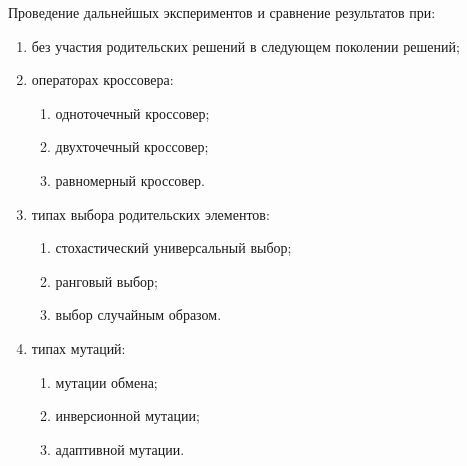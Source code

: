 Проведение дальнейшых экспериментов и сравнение результатов при:
\begin{enumerate}
  \item без участия родительских решений в следующем поколении решений;
  \item операторах кроссовера:
  \begin{enumerate}
    \item одноточечный кроссовер;
    \item двухточечный кроссовер;
    \item равномерный кроссовер.
  \end{enumerate}
  \item типах выбора родительских элементов:
  \begin{enumerate}
    \item стохастический универсальный выбор;
    \item ранговый выбор;
    \item выбор случайным образом.
  \end{enumerate}
  \item типах мутаций:
  \begin{enumerate}
    \item мутации обмена;
    \item инверсионной мутации;
    \item адаптивной мутации.
  \end{enumerate}
\end{enumerate}